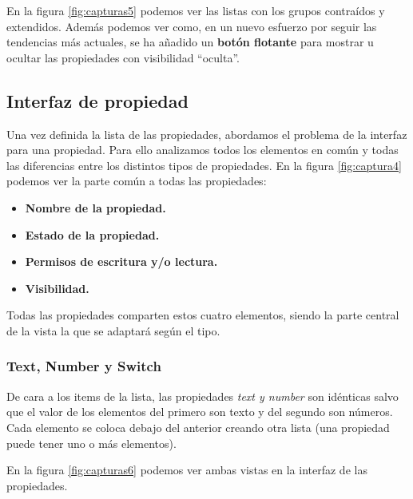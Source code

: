 En la figura \ref{fig:capturas5} podemos ver las listas con los grupos contraídos y extendidos. Además podemos ver como, en un nuevo esfuerzo por seguir las tendencias más actuales, se ha añadido un \textbf{botón flotante}\cite{ATMFAB} para mostrar u ocultar las propiedades con visibilidad ``oculta''.


\bigskip
\subsection{Interfaz de propiedad}
Una vez definida la lista de las propiedades, abordamos el problema de la interfaz para una propiedad. Para ello analizamos todos los elementos en común y todas las diferencias entre los distintos tipos de propiedades. En la figura \ref{fig:captura4} podemos ver la parte común a todas las propiedades:

\begin{itemize}
  \item \textbf{Nombre de la propiedad.}
  \item \textbf{Estado de la propiedad.}
  \item \textbf{Permisos de escritura y/o lectura.}
  \item \textbf{Visibilidad.}
\end{itemize}

Todas las propiedades comparten estos cuatro elementos, siendo la parte central de la vista la que se adaptará según el tipo.

\bigskip
\subsubsection{Text, Number y Switch}

De cara a los items de la lista, las propiedades \textit{text y number} son idénticas salvo que el valor de los elementos del primero son texto y del segundo son números. Cada elemento se coloca debajo del anterior creando otra lista (una propiedad puede tener uno o más elementos).

En la figura \ref{fig:capturas6} podemos ver ambas vistas en la interfaz de las propiedades. 


